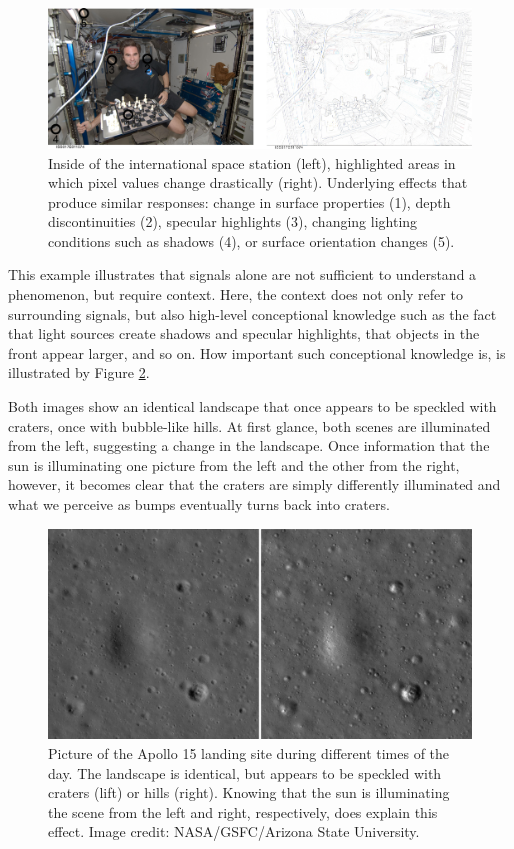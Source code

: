 \begin{figure}[!htb]
	\centering
		\includegraphics[width=\textwidth]{figs/iss_edges}
	\caption{Inside of the international space station (left), highlighted areas in which pixel values change drastically (right). Underlying effects that produce similar responses: change in surface properties (1), depth discontinuities (2), specular highlights (3), changing lighting conditions such as shadows (4), or surface orientation changes (5).
	\label{fig:iss_edges}}
\end{figure}

This example illustrates that signals alone are not sufficient to understand a phenomenon, but require context. Here, the context does not only refer to surrounding signals, but also high-level conceptional knowledge such as the fact that light sources create shadows and specular highlights, that objects in the front appear larger, and so on. How important such conceptional knowledge is, is illustrated by Figure \ref{fig:craters}.

Both images show an identical landscape that once appears to be speckled with craters, once with bubble-like hills. At first glance, both scenes are illuminated from the left, suggesting a change in the landscape. Once information that the sun is illuminating one picture from the left and the other from the right, however, it becomes clear that the craters are simply differently illuminated and what we perceive as bumps eventually turns back into craters. 

\begin{figure}[!htb]
	\centering
		\includegraphics[width=\textwidth]{figs/craters}
	\caption{Picture of the Apollo 15 landing site during different times of the day. The landscape is identical, but appears to be speckled with craters (lift) or hills (right). Knowing that the sun is illuminating the scene from the left and right, respectively, does explain this effect. Image credit: NASA/GSFC/Arizona State University.
	\label{fig:craters}}
\end{figure}

